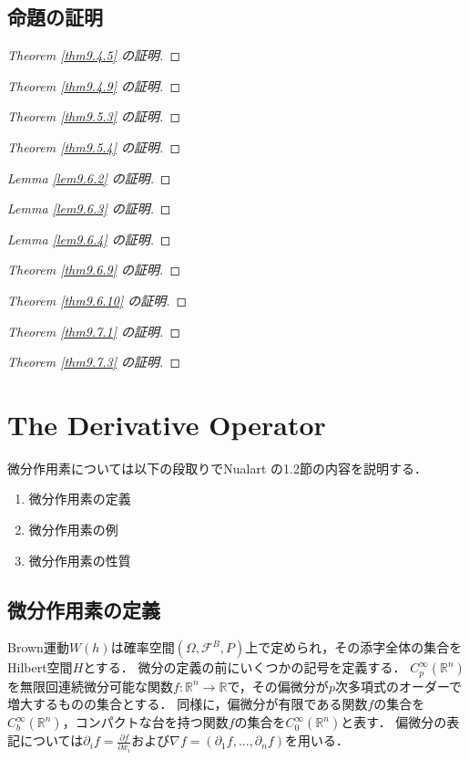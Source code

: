 \documentclass[a4paper,10pt]{jsarticle}
\theoremstyle{plain}
\newcommand{\enums}[1]{\begin{enumerate}#1\end{enumerate}}
\begin{document}
\subsection{命題の証明}
\begin{proof}[Theorem \ref{thm9.4.5} の証明]
\end{proof}
\begin{proof}[Theorem \ref{thm9.4.9} の証明]
\end{proof}
\begin{proof}[Theorem \ref{thm9.5.3} の証明]
\end{proof}
\begin{proof}[Theorem \ref{thm9.5.4} の証明]
\end{proof}
\begin{proof}[Lemma \ref{lem9.6.2} の証明]
\end{proof}
\begin{proof}[Lemma \ref{lem9.6.3} の証明]
\end{proof}
\begin{proof}[Lemma \ref{lem9.6.4} の証明]
\end{proof}
\begin{proof}[Theorem \ref{thm9.6.9} の証明]
\end{proof}
\begin{proof}[Theorem \ref{thm9.6.10} の証明]
\end{proof}
\begin{proof}[Theorem \ref{thm9.7.1} の証明]
\end{proof}
\begin{proof}[Theorem \ref{thm9.7.3} の証明]
\end{proof}

\section{The Derivative Operator}
微分作用素については以下の段取りでNualart\cite{Nualart2006} の1.2節の内容を説明する．
\enums{
	\item 微分作用素の定義
	\item 微分作用素の例
	\item 微分作用素の性質
}

\subsection{微分作用素の定義}
Brown運動$W(h)$は確率空間$(\Omega,\mathcal{F}^B,P)$上で定められ，その添字全体の集合をHilbert空間$H$とする．
微分の定義の前にいくつかの記号を定義する．
$C_p^\infty(\mathbb{R}^n)$を無限回連続微分可能な関数$f:\mathbb{R}^n\rightarrow\mathbb{R}$で，その偏微分が$p$次多項式のオーダーで増大するものの集合とする．
同様に，偏微分が有限である関数$f$の集合を$C^\infty_b(\mathbb{R}^n)$，コンパクトな台を持つ関数$f$の集合を$C^\infty_0(\mathbb{R}^n)$と表す．
偏微分の表記については$\partial_if=\frac{\partial f}{\partial x_i}$および$\nabla f=(\partial_1f,...,\partial_nf)$を用いる．
\end{document}
